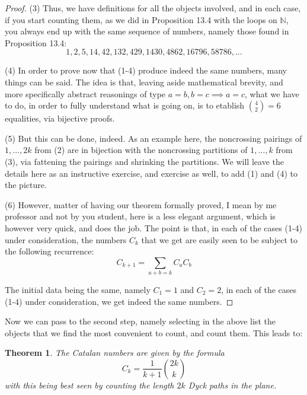 \documentclass[12pt]{amsbook}
\newtheorem{theorem}{Theorem}[chapter]
\begin{document}
\begin{proof}
(3) Thus, we have definitions for all the objects involved, and in each case, if you start counting them, as we did in Proposition 13.4 with the loops on $\mathbb N$, you always end up with the same sequence of numbers, namely those found in Proposition 13.4:
$$1,2,5,14,42,132,429,1430,4862,16796,58786,\ldots$$

(4) In order to prove now that (1-4) produce indeed the same numbers, many things can be said. The idea is that, leaving aside mathematical brevity, and more specifically abstract reasonings of type $a=b,b=c\implies a=c$, what we have to do, in order to fully understand what is going on, is to etablish $\binom{4}{2}=6$ equalities, via bijective proofs.

\medskip

(5) But this can be done, indeed. As an example here, the noncrossing pairings of $1,\ldots,2k$ from (2) are in bijection with the noncrossing partitions of $1,\ldots,k$ from (3), via  fattening the pairings and shrinking the partitions. We will leave the details here as an instructive exercise, and exercise as well, to add (1) and (4) to the picture.

\medskip

(6) However, matter of having our theorem formally proved, I mean by me professor and not by you student, here is a less elegant argument, which is however very quick, and does the job. The point is that, in each of the cases (1-4) under consideration, the numbers $C_k$ that we get are easily seen to be subject to the following recurrence:
$$C_{k+1}=\sum_{a+b=k}C_aC_b$$ 

The initial data being the same, namely $C_1=1$ and $C_2=2$, in each of the cases (1-4) under consideration, we get indeed the same numbers.
\end{proof}

Now we can pass to the second step, namely selecting in the above list the objects that we find the most convenient to count, and count them. This leads to:

\begin{theorem}
The Catalan numbers are given by the formula
$$C_k=\frac{1}{k+1}\binom{2k}{k}$$
with this being best seen by counting the length $2k$ Dyck paths in the plane.
\end{theorem}
\end{document}
